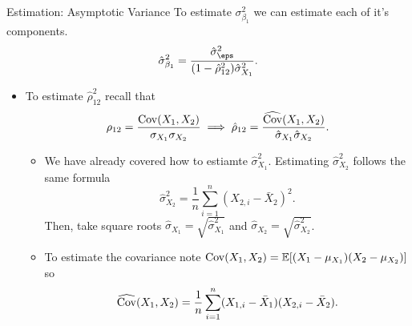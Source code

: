 \documentclass[notheorems,9pt, handout]{beamer}
\begin{document}
\begin{frame}{Estimation: Asymptotic Variance} 
	\label{frame:estimation2}
	To estimate \(\sigma_{\beta_1}^2\) we can estimate each of it's components.
	\[
		\hat\sigma_{\beta_1}^2 = \frac{\hat\sigma_\eps^2}{(1-\hat\rho_{12}^2)\hat\sigma_{X_1}^2} 
	.\]
	\begin{itemize}
		\item To estimate \(\hat\rho_{12}^2\) recall that 
		 \[
			 \rho_{12} = \frac{\operatorname{Cov}(X_1,X_2)}{\sigma_{X_1}\sigma_{X_2}}\implies \hat\rho_{12} = \frac{\widehat{\operatorname{Cov}}(X_1,X_2)}{\hat\sigma_{X_1}\hat\sigma_{X_2}}  
		.\]
		\begin{itemize}
			\item<2-> We have already covered how to estiamte \(\hat\sigma_{X_1}^2\). Estimating  \(\hat\sigma_{X_2}^2\) follows the same formula
			 \[
				 \hat\sigma_{X_2}^2 = \frac{1}{n}\sum_{i=1}^n (X_{2,i} - \bar X_2)^2
			.\]
			Then, take square roots \(\hat\sigma_{X_1} = \sqrt{\hat\sigma_{X_1}^2}\) and \(\hat\sigma_{X_2} =\sqrt{\hat\sigma_{X_2}^2}\).
			\item<3-> To estimate the covariance note \(\operatorname{Cov}(X_1,X_2) = \mathbb{E}[(X_1 - \mu_{X_1})(X_2 - \mu_{X_2})]\) so 
			\[
				\widehat{\operatorname{Cov}}(X_1,X_2) = \frac{1}{n}\sum_{i=1}^n (X_{1,i} - \bar X_1)(X_{2,i} - \bar X_2)
			.\] 
		\end{itemize}
	\end{itemize}
\end{frame}

\end{document}

